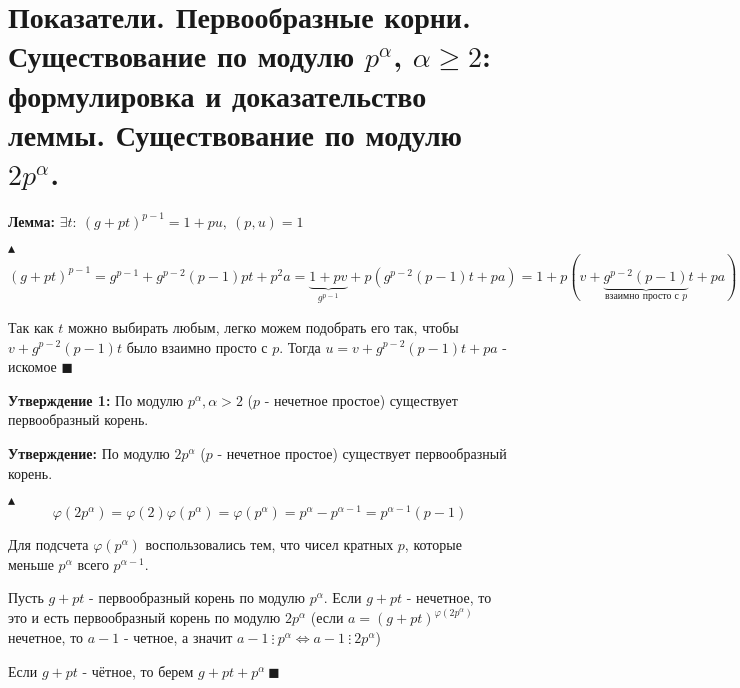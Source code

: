 \section{Показатели. Первообразные корни. Существование по модулю $p^\alpha$, $\alpha \geq 2$: формулировка и доказательство леммы. Существование по модулю $2p^\alpha$.}
\par \textbf{Лемма:} $\exists t: \: (g+pt)^{p-1}=1+pu, \: (p,u)=1$
\par $\blacktriangle$ $$(g+pt)^{p-1}=g^{p-1}+g^{p-2}(p-1)pt+p^2a=\underbrace{1+pv}_{g^{p-1}}+p(g^{p-2}(p-1)t+pa)=1+p(v+\underbrace{g^{p-2}(p-1)}_\text{взаимно просто с $p$}t+pa)$$
\par Так как $t$ можно выбирать любым, легко можем подобрать его так, чтобы $v+g^{p-2}(p-1)t$ было взаимно просто с $p$. Тогда $u=v+g^{p-2}(p-1)t+pa$ - искомое $\blacksquare$
\par \textbf{Утверждение 1:} По модулю $p^\alpha, \alpha>2$ ($p$ - нечетное простое) существует первообразный корень.
\par \textbf{Утверждение:} По модулю $2p^\alpha$ ($p$ - нечетное простое) существует первообразный корень.
\par $\blacktriangle$ $$\varphi(2p^\alpha)=\varphi(2)\varphi(p^\alpha)=\varphi(p^\alpha)=p^\alpha-p^{\alpha-1}=p^{\alpha-1}(p-1)$$
\par Для подсчета $\varphi(p^\alpha)$ воспользовались тем, что чисел кратных $p$, которые меньше $p^\alpha$ всего $p^{\alpha-1}$.
\par Пусть $g+pt$ - первообразный корень по модулю $p^\alpha$. Если $g+pt$ - нечетное, то это и есть первообразный корень по модулю $2p^\alpha$ (если $a=(g+pt)^{\varphi(2p^\alpha)}$ нечетное, то $a-1$ - четное, а значит $a-1 \: \vdots \: p^\alpha \Leftrightarrow a-1 \: \vdots \: 2p^\alpha$)
\par Если $g+pt$ - чётное, то берем $g+pt+p^\alpha \: \blacksquare$


